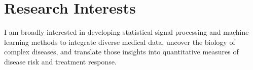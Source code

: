 \section{Research Interests}
\begin{sectioncontent}

I am broadly interested in developing statistical signal processing and machine learning methods to integrate diverse medical data, uncover the biology of complex diseases, and translate those insights into quantitative measures of disease risk and treatment response.



\end{sectioncontent}
